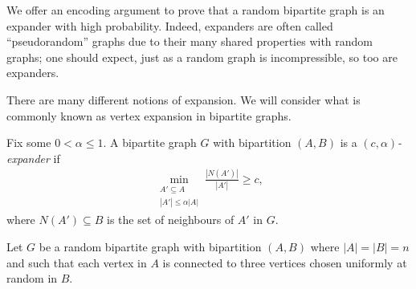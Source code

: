 We offer an encoding argument to prove that a random bipartite graph
is an expander with high probability. Indeed, expanders are often
called ``pseudorandom'' graphs due to their many shared properties
with random graphs; one should expect, just as a random graph is
incompressible, so too are expanders.

There are many different notions of expansion. We will consider what
is commonly known as vertex expansion in bipartite graphs.
\begin{defn}
  Fix some $0 < \alpha \leq 1$. A bipartite graph $G$ with bipartition
  $(A, B)$ is a \emph{$(c, \alpha)$-expander} if
  \begin{align*}
    \min_{\substack{{A' \subseteq A}\\{|A'| \leq \alpha |A|}}} \frac{|N(A')|}{|A'|} \geq c,
  \end{align*}
  where $N(A') \subseteq B$ is the set of neighbours of $A'$ in $G$.
\end{defn}

Let $G$ be a random bipartite graph with bipartition $(A, B)$ where
$|A| = |B| = n$ and such that each vertex in $A$ is connected to three
vertices chosen uniformly at random in $B$.

